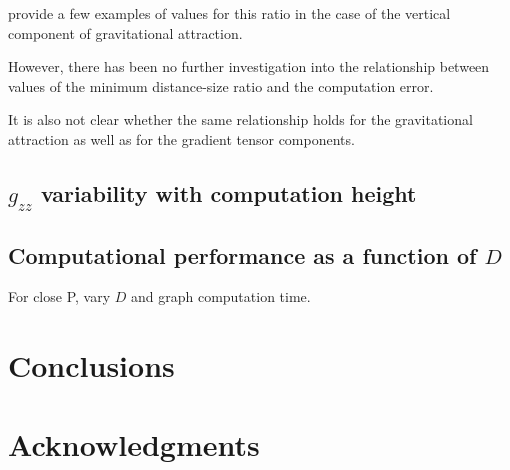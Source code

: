 \documentclass[manuscript]{geophysics}
\begin{document}
\citet{Li2011} provide a few examples of values for this ratio in the case of
the vertical component of gravitational attraction.

However, there has been no further investigation into
the relationship between values of the minimum distance-size
ratio and the computation error.

It is also not clear whether the same relationship holds for the gravitational
attraction as well as for the gradient tensor components.

\subsection{$g_{zz}$ variability with computation height}


\subsection{Computational performance as a function of $D$}

For close P, vary $D$ and graph computation time.


\section{Conclusions}

\section{Acknowledgments}




\end{document}

